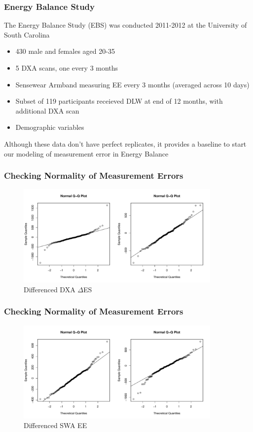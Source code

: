 \documentclass[handout]{beamer}\usepackage[]{graphicx}\usepackage[]{color}
\begin{document}
\begin{frame}
\frametitle{Energy Balance Study}
The Energy Balance Study (EBS) was conducted 2011-2012 at the University of South Carolina
\begin{itemize}
\item
430 male and females aged 20-35 \\
\item
5 DXA scans, one every 3 months
\item
Sensewear Armband measuring EE every 3 months (averaged across 10 days)
\item
Subset of 119 participants receieved DLW at end of 12 months, with additional DXA scan
\item
Demographic variables
\end{itemize}

\vspace{0.2cm}

Although these data don't have perfect replicates, it provides a baseline to start our modeling of measurement error in Energy Balance


\end{frame}

\begin{frame}
\frametitle{Checking Normality of Measurement Errors}

\begin{figure}
\centering
\includegraphics[width=10cm,height=5cm]{dxa_qq.pdf}
\caption{\small{Differenced DXA $\Delta$ES }}
\end{figure}

\end{frame}

\begin{frame}
\frametitle{Checking Normality of Measurement Errors}


\begin{figure}
\centering
\includegraphics[width=10cm,height=5cm]{swa_qq.pdf}
\caption{Differenced SWA  EE }
\end{figure}


\end{frame}
\end{document}
